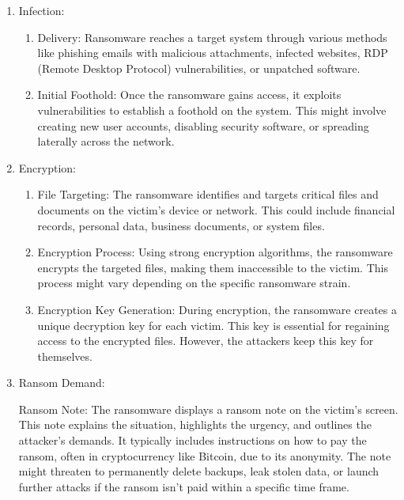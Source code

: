 \documentclass[12pt,twocolumn]{article}
\begin{document}
\begin{enumerate}[label=\arabic*.]
    \item Infection:

    \begin{enumerate}[label=\alph*.]
        \item Delivery: Ransomware reaches a target system through various methods like phishing emails with malicious attachments, infected websites, RDP (Remote Desktop Protocol) vulnerabilities, or unpatched software.

        \item Initial Foothold: Once the ransomware gains access, it exploits vulnerabilities to establish a foothold on the system. This might involve creating new user accounts, disabling security software, or spreading laterally across the network.
        
    \end{enumerate}

    \item Encryption:

    \begin{enumerate}[label=\alph*.]
        \item File Targeting: The ransomware identifies and targets critical files and documents on the victim's device or network. This could include financial records, personal data, business documents, or system files.

        \item Encryption Process: Using strong encryption algorithms, the ransomware encrypts the targeted files, making them inaccessible to the victim. This process might vary depending on the specific ransomware strain.

        \item Encryption Key Generation: During encryption, the ransomware creates a unique decryption key for each victim. This key is essential for regaining access to the encrypted files. However, the attackers keep this key for themselves.
        
    \end{enumerate}

    \item Ransom Demand:

        Ransom Note: The ransomware displays a ransom note on the victim's screen. This note explains the situation, highlights the urgency, and outlines the attacker's demands. It typically includes instructions on how to pay the ransom, often in cryptocurrency like Bitcoin, due to its anonymity. The note might threaten to permanently delete backups, leak stolen data, or launch further attacks if the ransom isn't paid within a specific time frame.


\end{enumerate}
\end{document}
